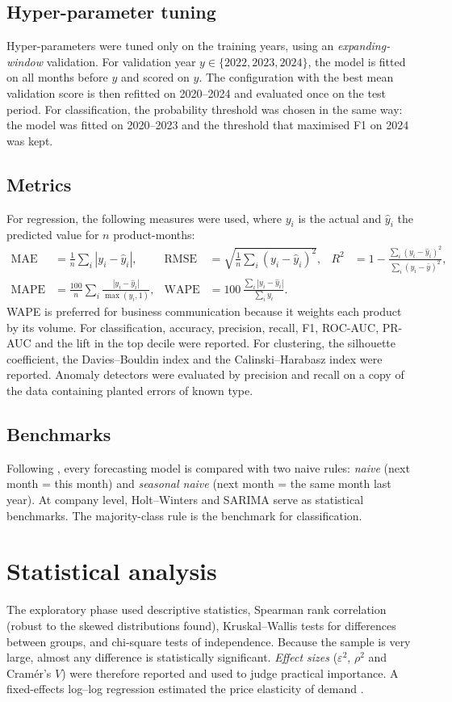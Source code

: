 \subsection{Hyper-parameter tuning}
Hyper-parameters were tuned only on the training years, using an \emph{expanding-window} validation. For
validation year $y \in \{2022, 2023, 2024\}$, the model is fitted on all months before $y$ and scored on $y$.
The configuration with the best mean validation score is then refitted on 2020--2024 and evaluated once on the
test period. For classification, the probability threshold was chosen in the same way: the model was fitted on
2020--2023 and the threshold that maximised F1 on 2024 was kept.

\subsection{Metrics}
For regression, the following measures were used, where $y_i$ is the actual and $\hat y_i$ the predicted value
for $n$ product-months:
\begin{align*}
\text{MAE} &= \tfrac{1}{n}\textstyle\sum_i |y_i-\hat y_i|, &
\text{RMSE} &= \sqrt{\tfrac{1}{n}\textstyle\sum_i (y_i-\hat y_i)^2}, &
R^2 &= 1-\frac{\sum_i (y_i-\hat y_i)^2}{\sum_i (y_i-\bar y)^2},\\
\text{MAPE} &= \tfrac{100}{n}\textstyle\sum_i \frac{|y_i-\hat y_i|}{\max(y_i,1)}, &
\text{WAPE} &= 100\,\frac{\sum_i |y_i-\hat y_i|}{\sum_i y_i}. &&
\end{align*}
WAPE is preferred for business communication because it weights each product by its volume. For
classification, accuracy, precision, recall, F1, ROC-AUC, PR-AUC and the lift in the top decile were reported.
For clustering, the silhouette coefficient, the Davies--Bouldin index and the Calinski--Harabasz index were
reported. Anomaly detectors were evaluated by precision and recall on a copy of the data containing planted
errors of known type.

\subsection{Benchmarks}
Following \citet{makridakis2018}, every forecasting model is compared with two naive rules: \emph{naive}
(next month = this month) and \emph{seasonal naive} (next month = the same month last year). At company level,
Holt--Winters and SARIMA serve as statistical benchmarks. The majority-class rule is the benchmark for
classification.

\section{Statistical analysis}
The exploratory phase used descriptive statistics, Spearman rank correlation (robust to the skewed
distributions found), Kruskal--Wallis tests for differences between groups, and chi-square tests of
independence. Because the sample is very large, almost any difference is statistically significant.
\emph{Effect sizes} ($\varepsilon^2$, $\rho^2$ and Cram\'er's $V$) were therefore reported and used to judge
practical importance. A fixed-effects log--log regression estimated the price elasticity of demand
\citep{wooldridge2020}.

